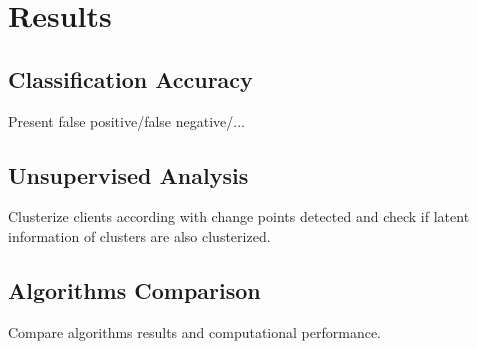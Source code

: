 \chapter{Results}
  \section{Classification Accuracy}
  Present false positive/false negative/...
  \section{Unsupervised Analysis}  
  Clusterize clients according with change points detected and check if latent information of clusters are also clusterized.
  \section{Algorithms Comparison}
  Compare algorithms results and computational performance.  

